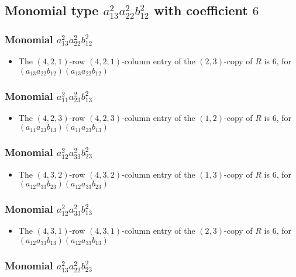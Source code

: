 \documentclass{article}
\begin{document}
\subsection{Monomial type $ a_{13}^{2} a_{22}^{2} b_{12}^{2} $ with coefficient $ 6 $}

\subsubsection{Monomial $ a_{13}^{2} a_{22}^{2} b_{12}^{2} $}

\begin{itemize}
\item The $(4, 2, 1)$-row $(4, 2, 1)$-column entry of the $ \left(2, 3\right) $-copy of $R$ is $ 6 $, for $( a_{13} a_{22} b_{12} )( a_{13} a_{22} b_{12} )$ 
\end{itemize}
\subsubsection{Monomial $ a_{11}^{2} a_{23}^{2} b_{13}^{2} $}

\begin{itemize}
\item The $(4, 2, 3)$-row $(4, 2, 3)$-column entry of the $ \left(1, 2\right) $-copy of $R$ is $ 6 $, for $( a_{11} a_{23} b_{13} )( a_{11} a_{23} b_{13} )$ 
\end{itemize}
\subsubsection{Monomial $ a_{12}^{2} a_{33}^{2} b_{23}^{2} $}

\begin{itemize}
\item The $(4, 3, 2)$-row $(4, 3, 2)$-column entry of the $ \left(1, 3\right) $-copy of $R$ is $ 6 $, for $( a_{12} a_{33} b_{23} )( a_{12} a_{33} b_{23} )$ 
\end{itemize}
\subsubsection{Monomial $ a_{12}^{2} a_{33}^{2} b_{13}^{2} $}

\begin{itemize}
\item The $(4, 3, 1)$-row $(4, 3, 1)$-column entry of the $ \left(2, 3\right) $-copy of $R$ is $ 6 $, for $( a_{12} a_{33} b_{13} )( a_{12} a_{33} b_{13} )$ 
\end{itemize}
\subsubsection{Monomial $ a_{13}^{2} a_{22}^{2} b_{23}^{2} $}
\end{document}
